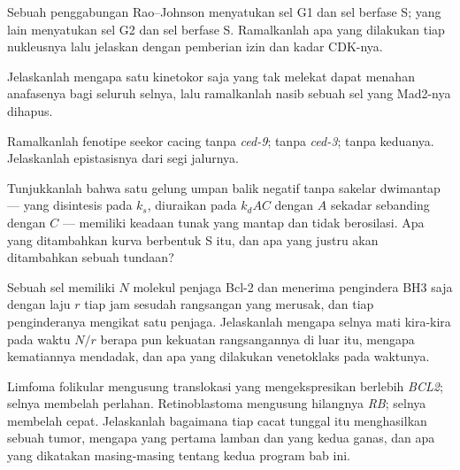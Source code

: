 \begin{exercise}[$\star\star$]\label{exo:b3:cell-cycle-apoptosis:7}
Sebuah penggabungan Rao--Johnson menyatukan sel G1 dan sel berfase S; yang
lain menyatukan sel G2 dan sel berfase S. Ramalkanlah apa yang dilakukan tiap
nukleusnya lalu jelaskan dengan pemberian izin dan kadar CDK-nya.
\end{exercise}

\begin{exercise}[$\star\star$]\label{exo:b3:cell-cycle-apoptosis:8}
Jelaskanlah mengapa satu kinetokor saja yang tak melekat dapat menahan
anafasenya bagi seluruh selnya, lalu ramalkanlah nasib sebuah sel yang Mad2-nya
dihapus.
\end{exercise}

\begin{exercise}[$\star\star$]\label{exo:b3:cell-cycle-apoptosis:9}
Ramalkanlah fenotipe seekor cacing tanpa \emph{ced-9}; tanpa
\emph{ced-3}; tanpa keduanya. Jelaskanlah epistasisnya dari segi
jalurnya.
\end{exercise}

\begin{exercise}[$\star\star\star$]\label{exo:b3:cell-cycle-apoptosis:10}
Tunjukkanlah bahwa satu gelung umpan balik negatif tanpa sakelar dwimantap
---  yang disintesis pada $k_{s}$, diuraikan pada $k_{d}AC$ dengan $A$
sekadar sebanding dengan $C$ --- memiliki keadaan tunak yang mantap dan tidak
berosilasi. Apa yang ditambahkan kurva berbentuk S itu, dan apa yang justru
akan ditambahkan sebuah tundaan?
\end{exercise}

\begin{exercise}[$\star\star\star$]\label{exo:b3:cell-cycle-apoptosis:11}
Sebuah sel memiliki $N$ molekul penjaga Bcl-2 dan menerima pengindera BH3 saja
dengan laju $r$ tiap jam sesudah rangsangan yang merusak, dan tiap penginderanya
mengikat satu penjaga. Jelaskanlah mengapa selnya mati kira-kira pada waktu $N/r$
berapa pun kekuatan rangsangannya di luar itu, mengapa kematiannya mendadak,
dan apa yang dilakukan venetoklaks pada waktunya.
\end{exercise}

\begin{exercise}[$\star\star\star$]\label{exo:b3:cell-cycle-apoptosis:12}
Limfoma folikular mengusung translokasi yang mengekspresikan berlebih
\emph{BCL2}; selnya membelah perlahan. Retinoblastoma mengusung hilangnya
\emph{RB}; selnya membelah cepat. Jelaskanlah bagaimana tiap cacat tunggal itu
menghasilkan sebuah tumor, mengapa yang pertama lamban dan yang kedua ganas,
dan apa yang dikatakan masing-masing tentang kedua program bab ini.
\end{exercise}

